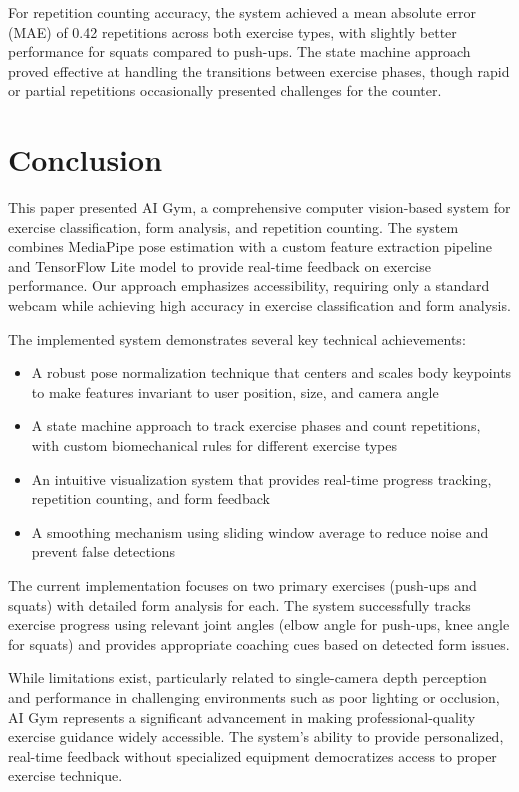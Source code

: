 \documentclass[11pt]{article}
\begin{document}
For repetition counting accuracy, the system achieved a mean absolute error (MAE) of 0.42 repetitions across both exercise types, with slightly better performance for squats compared to push-ups. The state machine approach proved effective at handling the transitions between exercise phases, though rapid or partial repetitions occasionally presented challenges for the counter.

\section{Conclusion}
This paper presented AI Gym, a comprehensive computer vision-based system for exercise classification, form analysis, and repetition counting. The system combines MediaPipe pose estimation with a custom feature extraction pipeline and TensorFlow Lite model to provide real-time feedback on exercise performance. Our approach emphasizes accessibility, requiring only a standard webcam while achieving high accuracy in exercise classification and form analysis.

The implemented system demonstrates several key technical achievements:
\begin{itemize}
\item A robust pose normalization technique that centers and scales body keypoints to make features invariant to user position, size, and camera angle
\item A state machine approach to track exercise phases and count repetitions, with custom biomechanical rules for different exercise types
\item An intuitive visualization system that provides real-time progress tracking, repetition counting, and form feedback
\item A smoothing mechanism using sliding window average to reduce noise and prevent false detections
\end{itemize}

The current implementation focuses on two primary exercises (push-ups and squats) with detailed form analysis for each. The system successfully tracks exercise progress using relevant joint angles (elbow angle for push-ups, knee angle for squats) and provides appropriate coaching cues based on detected form issues.

While limitations exist, particularly related to single-camera depth perception and performance in challenging environments such as poor lighting or occlusion, AI Gym represents a significant advancement in making professional-quality exercise guidance widely accessible. The system's ability to provide personalized, real-time feedback without specialized equipment democratizes access to proper exercise technique.
\end{document}
